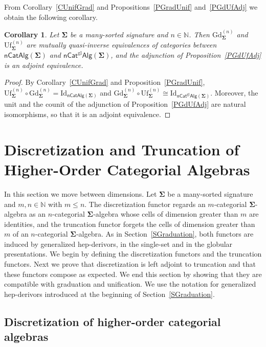 \documentclass[a4paper, reqno
]{amsart}
\newcommand{\sig}[1]{\mathbf{#1}}             %
\newcommand{\Id}{\mathrm{Id}}
\newcommand{\gl}{\mathrm{gl}}                %
\newcommand{\Gd}{\mathrm{Gd}}
\newcommand{\Uf}{\mathrm{Uf}}
\theoremstyle{plain}
\newtheorem{corollary}[theorem]{Corollary}
\theoremstyle{definition}
\begin{document}
From Corollary~\ref{CUnifGrad} and Propositions~\ref{PGradUnif} and~\ref{PGdUfAdj} we obtain the following corollary.

\begin{corollary}\label{CGdUfEquiv}
Let $\sig{\Sigma}$ be a many-sorted signature and $n\in\mathbb{N}$.
Then $\Gd^{(n)}_{\sig{\Sigma}}$ and $\Uf^{(n)}_{\sig{\Sigma}}$ are mutually quasi-inverse equivalences of categories between $\mathsf{nCatAlg}(\sig{\Sigma})$ and $\mathsf{nCat}^{\gl}\mathsf{Alg}(\sig{\Sigma})$, and the adjunction of Proposition~\ref{PGdUfAdj} is an adjoint equivalence.
\end{corollary}
\begin{proof}
By Corollary~\ref{CUnifGrad} and Proposition~\ref{PGradUnif}, $\Uf^{(n)}_{\sig{\Sigma}}\circ\Gd^{(n)}_{\sig{\Sigma}}=\Id_{\mathsf{nCatAlg}(\sig{\Sigma})}$ and $\Gd^{(n)}_{\sig{\Sigma}}\circ\Uf^{(n)}_{\sig{\Sigma}}\cong\Id_{\mathsf{nCat}^{\gl}\mathsf{Alg}(\sig{\Sigma})}$.
Moreover, the unit and the counit of the adjunction of Proposition~\ref{PGdUfAdj} are natural isomorphisms, so that it is an adjoint equivalence.
\end{proof}

\section{Discretization and Truncation of Higher-Order Categorial Algebras}\label{STruncation}

In this section we move between dimensions.
Let $\sig{\Sigma}$ be a many-sorted signature and $m,n\in\mathbb{N}$ with $m\leq n$.
The discretization functor regards an $m$-categorial $\sig{\Sigma}$-algebra as an $n$-categorial $\sig{\Sigma}$-algebra whose cells of dimension greater than $m$ are identities, and the truncation functor forgets the cells of dimension greater than $m$ of an $n$-categorial $\sig{\Sigma}$-algebra.
As in Section~\ref{SGraduation}, both functors are induced by generalized hep-derivors, in the single-set and in the globular presentations.
We begin by defining the discretization functors and the truncation functors.
Next we prove that discretization is left adjoint to truncation and that these functors compose as expected.
We end this section by showing that they are compatible with graduation and unification.
We use the notation for generalized hep-derivors introduced at the beginning of Section~\ref{SGraduation}.

\subsection{Discretization of higher-order categorial algebras}\label{SDiscretization}
\end{document}
